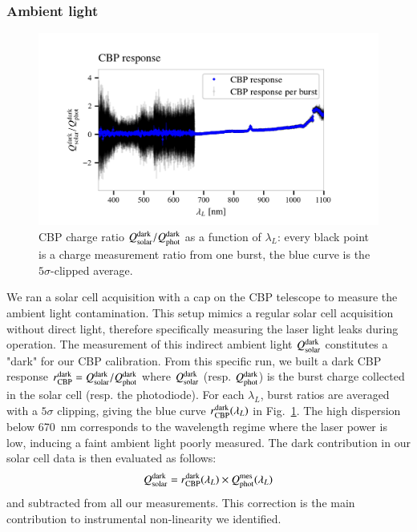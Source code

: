 

\subsubsection{Ambient light}\label{sec:sc_linearity}

\begin{figure}%
    \centering
    \includegraphics[width=\columnwidth]{fig/sc_dark_qswMAX.png}
    \caption{CBP charge ratio $Q_{\mathrm{solar}}^{\rm dark}/Q_{\mathrm{phot}}^{\rm dark}$ as a function of $\lambda_L$: every black point is a charge measurement ratio from one burst, the blue curve is the $5\sigma$-clipped average.}
    \label{fig:sc_dark}
\end{figure}

We ran a solar cell acquisition with a cap on the CBP telescope to measure the ambient light contamination. This setup mimics a regular solar cell acquisition without direct light, therefore specifically measuring the laser light leaks during operation. The measurement of this indirect ambient light $Q_{\mathrm{solar}}^{\rm dark}$ constitutes a "dark" for our CBP calibration. From this specific run, we built a dark CBP response $r_{\mathrm{CBP}}^{\rm dark} = Q_{\mathrm{solar}}^{\rm dark} / Q_{\mathrm{phot}}^{\rm dark}$ where $Q_{\mathrm{solar}}^{\rm dark}$ (resp. $Q_{\mathrm{phot}}^{\rm dark}$) is the burst charge collected in the solar cell (resp. the photodiode). For each $\lambda_L$, burst ratios are averaged with a $5\sigma$ clipping, giving the blue curve $r_{\mathrm{CBP}}^{\rm dark}(\lambda_L)$ in Fig.~\ref{fig:sc_dark}. The high dispersion below \SI{670}{\nano\meter} corresponds to the wavelength regime where the laser power is low, inducing a faint ambient light poorly measured. The dark contribution in our solar cell data is then evaluated as follows:
\begin{equation}
    Q_{\mathrm{solar}}^{\rm dark} = r_{\mathrm{CBP}}^{\rm dark}(\lambda_L) \times Q_{\mathrm{phot}}^{\mathrm{mes}}(\lambda_L)
\end{equation}
and subtracted from all our measurements. This correction is the main contribution to instrumental non-linearity we identified. 


